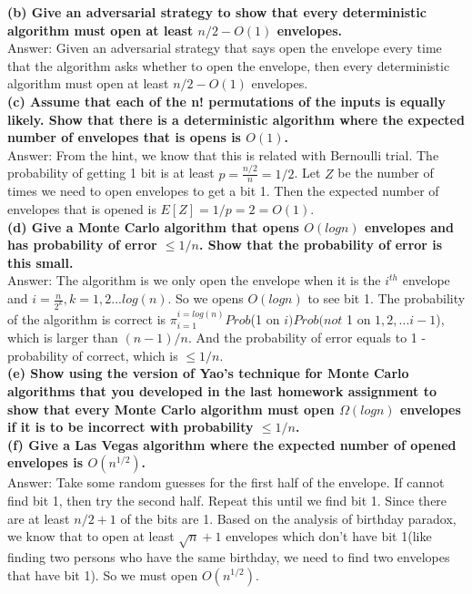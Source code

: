 \documentclass{article}
\begin{document}
\textbf{(b) Give an adversarial strategy to show that every deterministic algorithm must open at least $n/2 - O(1)$ envelopes.} \\ \newline
Answer: Given an adversarial strategy that says open the envelope every time that the algorithm asks whether to open the envelope, then every deterministic algorithm must open at least $n/2 - O(1)$ envelopes. \\ \newline
\textbf{(c) Assume that each of the n! permutations of the inputs is equally likely. Show that there is a deterministic algorithm where the expected number of envelopes that is opens is $O(1)$.} \\ \newline
Answer: From the hint, we know that this is related with Bernoulli trial. The probability of getting 1 bit is at least $p = \frac{n/2}{n}= 1/2$. Let $Z$ be the number of times we need to open envelopes to get a bit 1. Then the expected number of envelopes that is opened is $E[Z] = 1/p = 2 = O(1)$. \\\newline
\textbf{(d) Give a Monte Carlo algorithm that opens $O(logn)$ envelopes and has probability of error $\leq 1/n$. Show that the probability of error is this small.} \\ \newline
Answer: The algorithm is we only open the envelope when it is the $i^{th}$ envelope and $i = \frac{n}{2^k}, k = 1, 2 ... log(n)$. So we opens $O(logn)$ to see bit 1. The probability of the algorithm is correct is $\pi_{i=1}^{i=log(n)}Prob$(1 on $i)Prob(not$ 1 on $1, 2, ... i-1$), which is larger than $(n-1)/n$. And the probability of error equals to 1 - probability of correct, which is $\leq 1/n$. \\\newline
\textbf{(e) Show using the version of Yao’s technique for Monte Carlo algorithms that you developed in the last homework assignment to show that every Monte Carlo algorithm must open $\Omega(logn)$ envelopes if it is to be incorrect with probability $\leq 1/n$.} \\ \newline
\textbf{(f) Give a Las Vegas algorithm where the expected number of opened envelopes is $O(n^{1/2})$.}\\ \newline
Answer: Take some random guesses for the first half of the envelope. If cannot find bit 1, then try the second half. Repeat this until we find bit 1. Since there are at least $n/2 + 1$ of the bits are 1. Based on the analysis of birthday paradox, we know that to open at least $\sqrt{n} + 1$ envelopes which don't have bit 1(like finding two persons who have the same birthday, we need to find two envelopes that have bit 1). So we must open  $O(n^{1/2})$.
\end{document}
